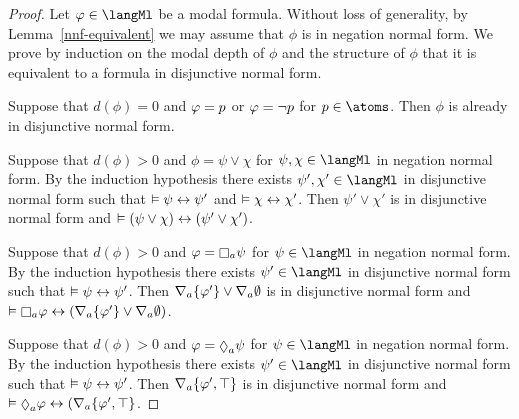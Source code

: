 \begin{proof}
Let $\phi \in \langMl$ be a modal formula.
Without loss of generality, by Lemma~\ref{nnf-equivalent} we may assume that $\phi$ is in negation normal form.
We prove by induction on the modal depth of $\phi$ and the structure of $\phi$ that it is equivalent to a formula in disjunctive normal form.

Suppose that $d(\phi) = 0$ and $\varphi = p$ or $\varphi = \lnot p$ for $\atomP \in \atoms$.
Then $\phi$ is already in disjunctive normal form.

Suppose that $d(\phi) > 0$ and $\phi = \psi \lor \chi$ for $\psi, \chi \in \langMl$ in negation normal form.
By the induction hypothesis there exists $\psi', \chi' \in \langMl$ in disjunctive normal form such that $\vDash \psi \leftrightarrow \psi'$ and $\vDash \chi \leftrightarrow \chi'$.
Then $\psi' \lor \chi'$ is in disjunctive normal form and $\vDash (\psi \lor \chi) \leftrightarrow (\psi' \lor \chi')$.

Suppose that $d(\phi) > 0$ and $\phi = \necessaryA \psi$ for $\psi \in \langMl$ in negation normal form.
By the induction hypothesis there exists $\psi' \in \langMl$ in disjunctive normal form such that $\vDash \psi \leftrightarrow \psi'$.
Then $\nabla_{a} \{\varphi'\} \lor \nabla_{a} \emptyset$ is in disjunctive normal form and $\entails \necessaryA \phi \iff (\coversA \{\phi'\} \lor \coversA \emptyset)$.

Suppose that $d(\phi) > 0$ and $\phi = \possibleA \psi$ for $\psi \in \langMl$ in negation normal form.
By the induction hypothesis there exists $\psi' \in \langMl$ in disjunctive normal form such that $\vDash \psi \leftrightarrow \psi'$.
Then $\nabla_{a} \{\varphi', \top\}$ is in disjunctive normal form and $\entails \possibleA \phi \iff (\coversA \{\phi', \top\}$.


\end{proof}
